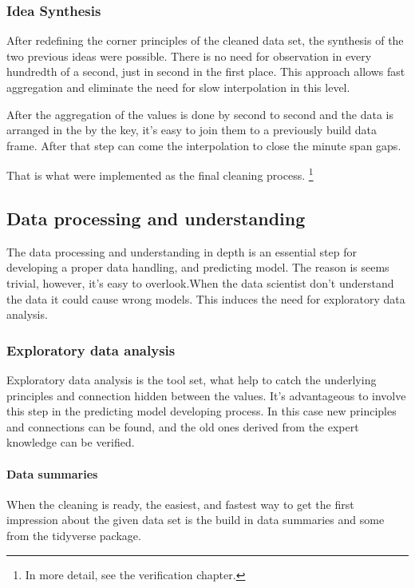 		\subsubsection{Idea Synthesis}
		After redefining the corner principles of the cleaned data set, the synthesis of the two previous ideas were possible.
		There is no need for observation in every hundredth of a second, just in second in the first place. This approach allows fast aggregation and eliminate the need for slow interpolation in this level.

		After the aggregation of the values is done by second to second and the data is arranged in the by the key, it's easy to join them to a previously build data frame. After that step can come the interpolation to close the minute span gaps.

		That is what were implemented as the final cleaning process. \footnote{In more detail, see the verification chapter.}
\subsection{Data processing and understanding}
		The data processing and understanding in depth is an essential step for developing a proper data handling, and predicting model.
		The reason is seems trivial, however, it's easy to overlook.When the data scientist don't understand the data it could cause wrong models. This induces the need for exploratory data analysis.
	\subsubsection{Exploratory data analysis}
		Exploratory data analysis is the tool set, what help to catch the underlying principles and connection hidden between the values. It's advantageous to involve this step in the predicting model developing process. In this case new principles and connections can be found, and the old ones derived from the expert knowledge can be verified.
		\paragraph{Data summaries}
		When the cleaning is ready, the easiest, and fastest way to get the first impression about the given data set is the build in data summaries and some from the tidyverse package.

